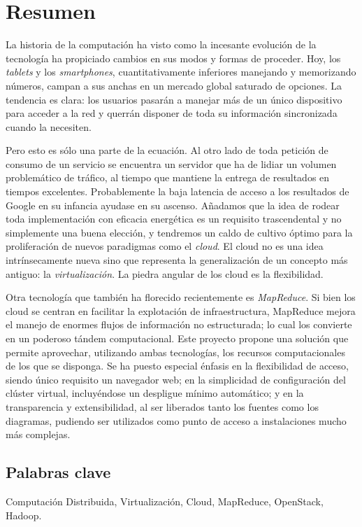\chapter*{Resumen}

\noindent La historia de la computaci\'on ha visto como la incesante evoluci\'on de la tecnolog\'ia ha propiciado cambios en sus modos y formas de proceder. Hoy, los \textit{tablets} y los \textit{smartphones}, cuantitativamente inferiores manejando y me\-mo\-ri\-zan\-do n\'umeros, campan a sus anchas en un mercado global saturado de opciones. La tendencia es clara: los usuarios pasar\'an a manejar m\'as de un \'unico dispositivo para acceder a la red y querr\'an disponer de toda su informaci\'on sincronizada cuando la necesiten.\newline

Pero esto es s\'olo una parte de la ecuaci\'on. Al otro lado de toda petici\'on de consumo de un servicio se encuentra un servidor que ha de lidiar un volumen problem\'atico de tr\'afico, al tiempo que mantiene la entrega de resultados en tiempos excelentes. Probablemente la baja latencia de acceso a los resultados de Google en su infancia ayudase en su ascenso. A\~nadamos que la idea de rodear toda implementaci\'on con eficacia energ\'etica es un requisito trascendental y no simplemente una buena elecci\'on, y tendremos un caldo de cultivo \'optimo para la proliferaci\'on de nuevos paradigmas como el \textit{cloud}. El cloud no es una idea intr\'insecamente nueva sino que representa la generalizaci\'on de un concepto m\'as antiguo: la \emph{virtualizaci\'on}. La piedra angular de los cloud es la flexibilidad.\newline

Otra tecnolog\'ia que tambi\'en ha florecido recientemente es \textit{MapReduce}. Si bien los cloud se centran en facilitar la explotaci\'on de infraestructura, MapReduce mejora el manejo de enormes flujos de informaci\'on no estructurada; lo cual los convierte en un poderoso t\'andem computacional.
Este proyecto propone una soluci\'on que permite aprovechar, utilizando ambas tecnolog\'ias, los recursos computacionales de los que se disponga. Se ha puesto especial \'enfasis en la flexibilidad de acceso, siendo \'unico requisito un na\-ve\-ga\-dor web; en la simplicidad de con\-fi\-gu\-ra\-ci\'on del cl\'uster virtual, incluy\'endose un despligue m\'inimo autom\'atico; y en la transparencia y extensibilidad, al ser liberados tanto los fuentes como los diagramas, pudiendo ser utilizados como punto de acceso a instalaciones mucho m\'as complejas.

\section*{Palabras clave}
\noindent Computaci\'on Distribuida, Virtualizaci\'on, Cloud, MapReduce, OpenStack, Hadoop.
